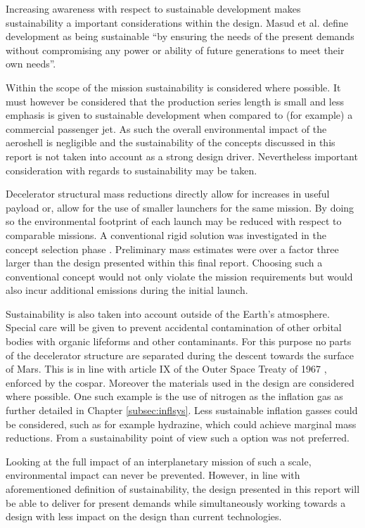 Increasing awareness with respect to sustainable development makes sustainability a important considerations within the design. Masud et al. define development as being sustainable  ``by ensuring the needs of the present demands without compromising any power or ability of future generations to meet their own needs''\cite[p.85]{Masud2011}. 

Within the scope of the mission sustainability is considered where possible. It must however be considered that the production series length is small and less emphasis is given to sustainable development when compared to (for example) a commercial passenger jet. As such the overall environmental impact of the aeroshell is negligible and the sustainability of the concepts discussed in this report is not taken into account as a strong design driver. Nevertheless important consideration with regards to sustainability may be taken. 

Decelerator structural mass reductions directly allow for increases in useful payload or, allow for the use of smaller launchers for the same mission. By doing so the environmental footprint of each launch may be reduced with respect to comparable missions. A conventional rigid solution was investigated in the concept selection phase \cite{Balasooriyan2015b}. Preliminary mass estimates were over a factor three larger than the design presented within this final report. Choosing such a conventional concept would not only violate the mission requirements but would also incur additional emissions during the initial launch.

Sustainability is also taken into account outside of the Earth's atmosphere. Special care will be given to prevent accidental contamination of other orbital bodies with organic lifeforms and other contaminants. For this purpose no parts of the decelerator structure are separated during the descent towards the surface of Mars. This is in line with article IX of the Outer Space Treaty of 1967 \cite{UnitedNations2008}, enforced by the \gls{cospar}. Moreover the materials used in the design are considered where possible. One such example is the use of nitrogen as the inflation gas as further detailed in Chapter \ref{subsec:inflsys}. Less sustainable inflation gasses could be considered, such as for example hydrazine, which could achieve marginal mass reductions. From a sustainability point of view such a option was not preferred.

Looking at the full impact of an interplanetary mission of such a scale, environmental impact can never be prevented. However, in line with aforementioned definition of sustainability, the design presented in this report will be able to deliver for present demands while simultaneously working towards a design with less impact on the design than current technologies.

